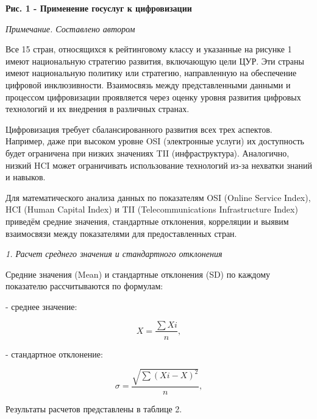 {\bfseries Рис. 1 - Применение госуслуг к цифровизации}

\emph{Примечание. Составлено автором}

\begin{multicols}{2}
Все 15 стран, относящихся к рейтинговому классу и указанные на рисунке 1
имеют национальную стратегию развития, включающую цели ЦУР. Эти страны
имеют национальную политику или стратегию, направленную на обеспечение
цифровой инклюзивности. Взаимосвязь между представленными данными и
процессом цифровизации проявляется через оценку уровня развития цифровых
технологий и их внедрения в различных странах.

Цифровизация требует сбалансированного развития всех трех аспектов.
Например, даже при высоком уровне OSI (электронные услуги) их
доступность будет ограничена при низких значениях TII (инфраструктура).
Аналогично, низкий HCI может ограничивать использование технологий из-за
нехватки знаний и навыков.

Для математического анализа данных по показателям OSI (Online Service
Index), HCI (Human Capital Index) и TII (Telecommunications
Infrastructure Index) приведём средние значения, стандартные отклонения,
корреляции и выявим взаимосвязи между показателями для предоставленных
стран.

\emph{1. Расчет среднего значения и стандартного отклонения}

Средние значения (Mean) и стандартные отклонения (SD) по каждому
показателю рассчитываются по формулам:

- среднее значение:

\begin{equation}
    X = \frac{\sum Xi}{n},
\end{equation}

- стандартное отклонение:

\begin{equation}
    \sigma = \frac{\sqrt{\sum (Xi - X)^2}}{n},
\end{equation}

Результаты расчетов представлены в таблице 2.
\end{multicols}

